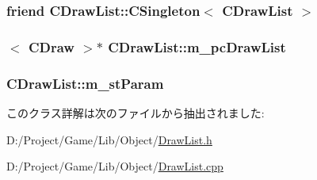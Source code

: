 \subsubsection[{C\+Singleton$<$ C\+Draw\+List $>$}]{\setlength{\rightskip}{0pt plus 5cm}friend {\bf C\+Draw\+List\+::\+C\+Singleton}$<$ {\bf C\+Draw\+List} $>$\hspace{0.3cm}{\ttfamily [private]}}\label{class_c_draw_list_ace89c5af0071b6f1a4798baf330cd9a0}
\hypertarget{class_c_draw_list_a9657465a848a483be27ca0fbb41af73a}{}
\subsubsection[{m\+\_\+pc\+Draw\+List}]{$<$ {\bf C\+Draw} $>$$\ast$ C\+Draw\+List\+::m\+\_\+pc\+Draw\+List\hspace{0.3cm}{\ttfamily [protected]}}\label{class_c_draw_list_a9657465a848a483be27ca0fbb41af73a}
\hypertarget{class_c_draw_list_aa1852cdf435d6e0d1b0057bfa29115ef}{}
\subsubsection[{m\+\_\+st\+Param}]{ C\+Draw\+List\+::m\+\_\+st\+Param\hspace{0.3cm}{\ttfamily [protected]}}\label{class_c_draw_list_aa1852cdf435d6e0d1b0057bfa29115ef}


このクラス詳解は次のファイルから抽出されました\+:\begin{DoxyCompactItemize}
\item 
D\+:/\+Project/\+Game/\+Lib/\+Object/\hyperlink{_draw_list_8h}{Draw\+List.\+h}\item 
D\+:/\+Project/\+Game/\+Lib/\+Object/\hyperlink{_draw_list_8cpp}{Draw\+List.\+cpp}\end{DoxyCompactItemize}
